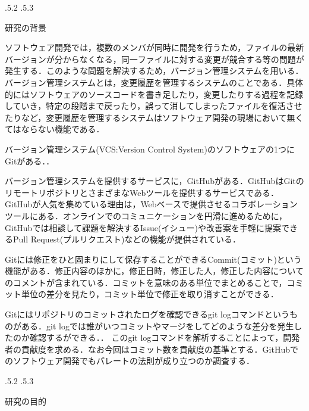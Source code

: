 \documentclass[uplatex]{jsarticle}
\title{\vspace{-14mm}{オープンソースソフトウェア開発における開発者あたりのコミット数のパレート分析}}
\author{PMコース　矢吹研究室　1342100　春川 直幸}
\date{}%
\makeatletter
\renewcommand{\section}{%
    \if@slide\clearpage\fi
    \@startsection{section}{1}{\z@}%
    {\Cvs \@plus.5\Cdp \@minus.2\Cdp}%
    {.5\Cvs \@plus.3\Cdp}%
    {\normalfont\raggedright}}
\makeatother
\begin{document}
\maketitle





\section{研究の背景}

ソフトウェア開発では，複数のメンバが同時に開発を行うため，ファイルの最新バージョンが分からなくなる，同一ファイルに対する変更が競合する等の問題が発生する．このような問題を解決するため，バージョン管理システムを用いる\cite{ikeda2014}．バージョン管理システムとは，変更履歴を管理するシステムのことである．具体的にはソフトウェアのソースコードを書き足したり，変更したりする過程を記録していき，特定の段階まで戻ったり，誤って消してしまったファイルを復活させたりなど，変更履歴を管理するシステムはソフトウェア開発の現場において無くてはならない機能である\cite{otuka2014}．

バージョン管理システム(VCS:Version Control System)のソフトウェアの1つにGitがある．\cite{shioya2014}．

バージョン管理システムを提供するサービスに，GitHubがある．GitHubはGitのリモートリポジトリとさまざまなWebツールを提供するサービスである．GitHubが人気を集めている理由は，Webベースで提供させるコラボレーションツールにある．オンラインでのコミュニケーションを円滑に進めるために，GitHubでは相談して課題を解決するIssue(イシュー)や改善案を手軽に提案できるPull Request(プルリクエスト)などの機能が提供されている\cite{shioya2014}．

Gitには修正をひと固まりにして保存することができるCommit(コミット)という機能がある．修正内容のほかに，修正日時，修正した人，修正した内容についてのコメントが含まれている．コミットを意味のある単位でまとめることで，コミット単位の差分を見たり，コミット単位で修正を取り消すことができる\cite{shioya2014}．

Gitにはリポジトリのコミットされたログを確認できるgit logコマンドというものがある．git logでは誰がいつコミットやマージをしてどのような差分を発生したのか確認するができる．\cite{otuka2014}．
このgit logコマンドを解析することによって，開発者の貢献度を求める．なお今回はコミット数を貢献度の基準とする．GitHubでのソフトウェア開発でもパレートの法則が成り立つのか調査する．

\section{研究の目的}
\end{document}
